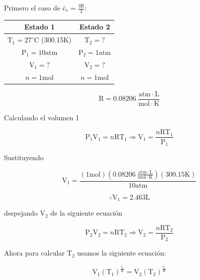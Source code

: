 \documentclass[12pt]{article}
\begin{document}
Primero el caso de $\mathrm{\bar{c}}_v=\frac{3\mathrm{R}}{2}$:
\begin{center}
	\begin{tabular}{| c | c |}
		\hline
		Estado 1 &     Estado 2 \\ \hline
		$\mathrm{T}_1=27^{\circ}\mathrm{C}$\; (300.15$\mathrm{K}$) &    $\mathrm{T}_2=?$ \\
		$\mathrm{P}_1=10\mathrm{atm}$ &    $\mathrm{P}_2=1\mathrm{atm}$ \\
		$\mathrm{V}_1=?$ &    $\mathrm{V}_2=?$\\
		$n=1\mathrm{mol}$&    $n=1\mathrm{mol}$\\ \hline
	\end{tabular}
	\begin{displaymath}
		\mathrm{R}=0.08206\; \frac{\mathrm{atm}\cdot\mathrm{L}}{\mathrm{mol}\cdot\mathrm{K}}
	\end{displaymath}
\end{center}

Calculando el volumen 1

\begin{displaymath}
	\mathrm{P}_1\mathrm{V}_1=n\mathrm{R}\mathrm{T}_1\Rightarrow \mathrm{V}_1=\frac{n\mathrm{R}\mathrm{T}_1}{\mathrm{P}_1}
\end{displaymath}

Sustituyendo

\begin{displaymath}
	\mathrm{V}_1=\frac{\left( 1\mathrm{mol} \right) \left( 0.08206\; \frac{\mathrm{atm}\cdot\mathrm{L}}{\mathrm{mol}\cdot\mathrm{K}} \right)\left( 300.15\mathrm{K} \right)}{10\mathrm{atm}}
\end{displaymath}

\begin{displaymath}
	\therefore\mathrm{V}_1=2.463\mathrm{L}
\end{displaymath}

despejando $\mathrm{V}_2$ de la siguiente ecuación 

\begin{displaymath}
	\mathrm{P}_2\mathrm{V}_2=n\mathrm{R}\mathrm{T}_2\Rightarrow \mathrm{V}_2=\frac{n\mathrm{R}\mathrm{T}_2}{\mathrm{P}_2}
\end{displaymath}

Ahora para calcular $\mathrm{T}_2$ usamos la siguiente ecuación:

\begin{displaymath}
	\mathrm{V}_1(\mathrm{T}_1)^{\frac{\mathrm{\bar{c}}_v}{\mathrm{R}}}= \mathrm{V}_2(\mathrm{T}_2)^{\frac{\mathrm{\bar{c}}_v}{\mathrm{R}}}
\end{displaymath}
\end{document}

